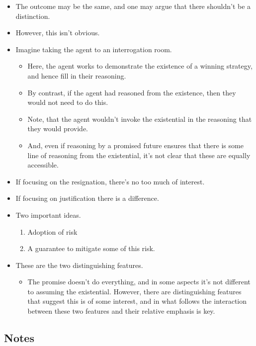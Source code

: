 \documentclass[10pt]{article}
\begin{document}
\begin{itemize}
\item The outcome may be the same, and one may argue that there shouldn't be a distinction.
\item However, this isn't obvious.
\item Imagine taking the agent to an interrogation room.
  \begin{itemize}
  \item Here, the agent works to demonstrate the existence of a winning strategy, and hence fill in their reasoning.
  \item By contrast, if the agent had reasoned from the existence, then they would not need to do this.
  \item Note, that the agent wouldn't invoke the existential in the reasoning that they would provide.
  \item And, even if reasoning by a promised future ensures that there is some line of reasoning from the existential, it's not clear that these are equally accessible.
  \end{itemize}
\item If focusing on the resignation, there's no too much of interest.
\item If focusing on justification there is a difference.
\end{itemize}

\begin{itemize}
\item Two important ideas.
  \begin{enumerate}
  \item Adoption of risk
  \item A guarantee to mitigate some of this risk.
  \end{enumerate}
\item These are the two distinguishing features.
  \begin{itemize}
  \item The promise doesn't do everything, and in some aspects it's not different to assuming the existential.
    However, there are distinguishing features that suggest this is of some interest, and in what follows the interaction between these two features and their relative emphasis is key.
  \end{itemize}
\end{itemize}

\subsection{Notes}
\label{sec:notes}
\end{document}
